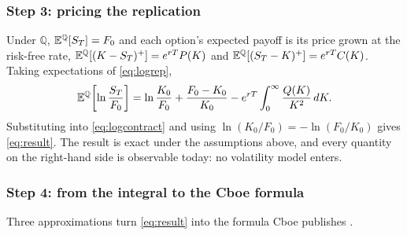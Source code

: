 \subsubsection{Step 3: pricing the replication}

Under $\mathbb{Q}$, $\mathbb{E}^{\mathbb{Q}}[S_T]=F_0$ and each option's expected payoff is its price grown at the risk-free rate, $\mathbb{E}^{\mathbb{Q}}[(K-S_T)^+]=e^{rT}P(K)$ and $\mathbb{E}^{\mathbb{Q}}[(S_T-K)^+]=e^{rT}C(K)$. Taking expectations of \eqref{eq:logrep},
\begin{equation}
  \mathbb{E}^{\mathbb{Q}}\!\left[\ln\frac{S_T}{F_0}\right] = \ln\frac{K_0}{F_0} + \frac{F_0-K_0}{K_0}
  - e^{rT}\int_0^{\infty}\frac{Q(K)}{K^2}\,dK .
\end{equation}
Substituting into \eqref{eq:logcontract} and using $\ln(K_0/F_0)=-\ln(F_0/K_0)$ gives \eqref{eq:result}. The result is exact under the assumptions above, and every quantity on the right-hand side is observable today: no volatility model enters.

\subsubsection{Step 4: from the integral to the Cboe formula}

Three approximations turn \eqref{eq:result} into the formula Cboe publishes \cite{cboewp,cboemeth}.

